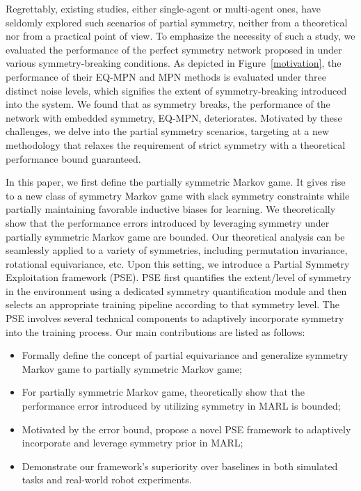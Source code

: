 \documentclass[letterpaper]{article} %
\theoremstyle{definition}
\begin{document}
Regrettably, existing studies, either single-agent or multi-agent ones, have seldomly explored such scenarios of partial symmetry, neither from a theoretical nor from a practical point of view. To emphasize the necessity of such a study, we evaluated the performance of the perfect symmetry network proposed in \cite{vand} under various symmetry-breaking conditions. As depicted in Figure~\ref{motivation}, the performance of their EQ-MPN and MPN methods is evaluated under three distinct noise levels, which signifies the extent of symmetry-breaking introduced into the system. We found that as symmetry breaks, the performance of the network with embedded symmetry, EQ-MPN, deteriorates. Motivated by these challenges, we delve into the partial symmetry scenarios, targeting at a new methodology that relaxes the requirement of strict symmetry with a theoretical performance bound guaranteed.


In this paper, we first define the partially symmetric Markov game. It gives rise to a new class of symmetry Markov game with slack symmetry constraints while partially maintaining favorable inductive biases for learning. We theoretically show that the performance errors introduced by leveraging symmetry under partially symmetric Markov game are bounded. Our theoretical analysis can be seamlessly applied to a variety of symmetries, including permutation invariance, rotational equivariance, etc. Upon this setting, we introduce a Partial Symmetry Exploitation framework (PSE). PSE first quantifies the extent/level of symmetry in the environment using a dedicated symmetry quantification module and then selects an appropriate training pipeline according to that symmetry level. The PSE involves several technical components to adaptively incorporate symmetry into the training process. Our main contributions are listed as follows:
\begin{itemize}
\item Formally define the concept of partial equivariance and generalize symmetry Markov game to partially symmetric Markov game;
\item For partially symmetric Markov game, theoretically show that the performance error introduced by utilizing symmetry in MARL is bounded;
\item Motivated by the error bound, propose a novel PSE framework to adaptively incorporate and leverage symmetry prior in MARL;
\item Demonstrate our framework's superiority over baselines in both simulated tasks and real-world robot experiments.
\end{itemize}
\end{document}
